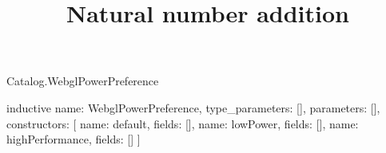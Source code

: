 \begin{lexlean}{Catalog.WebglPowerPreference}
\title{Natural number addition}
\begin{semanticmodule}
inductive{
  name: WebglPowerPreference,
  type_parameters: [],
  parameters: [],
  constructors: [
    {name: default, fields: []},
    {name: lowPower, fields: []},
    {name: highPerformance, fields: []}
  ]
}
\end{semanticmodule}
\end{lexlean}
